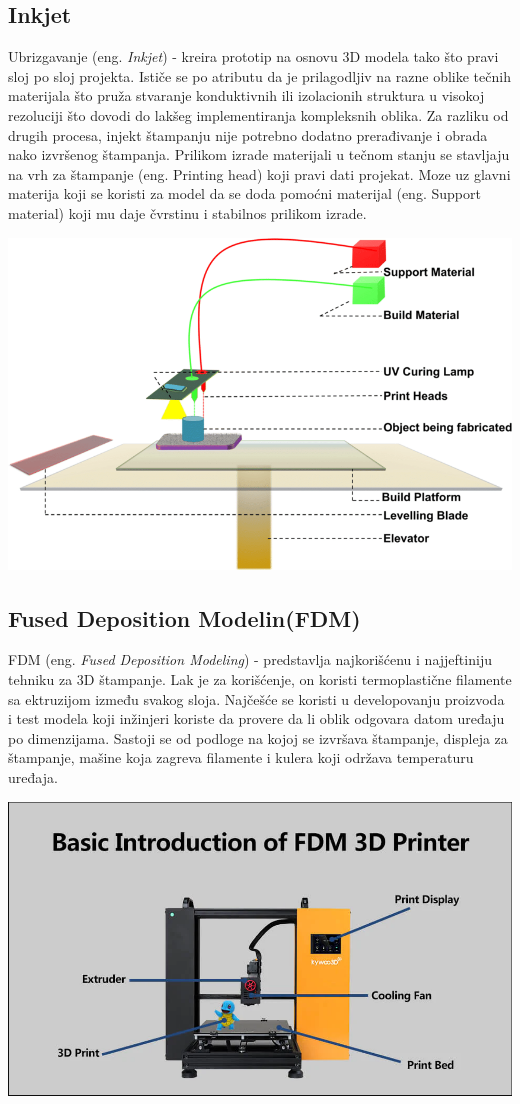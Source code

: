 \documentclass[a4paper]{article}
\begin{document}
\subsection{Inkjet}
\label{subsec:podnaslov1}
Ubrizgavanje (eng. \emph{Inkjet}) - kreira prototip na osnovu 3D modela tako što pravi sloj po sloj projekta.
\bigbreak Ističe se po atributu da je prilagodljiv na razne oblike tečnih materijala što pruža stvaranje konduktivnih ili izolacionih struktura u visokoj rezoluciji što dovodi do lakšeg implementiranja kompleksnih oblika. 
\bigbreak Za razliku od drugih procesa, injekt štampanju nije potrebno dodatno prerađivanje i obrada nako izvršenog štampanja.
\bigbreak Prilikom izrade materijali u tečnom stanju se stavljaju na vrh za štampanje (eng. Printing head) koji pravi dati projekat.
\bigbreak Moze uz glavni materija koji se koristi za model da se doda pomoćni materijal (eng. Support material) koji mu daje čvrstinu i stabilnos prilikom izrade.
\begin{center}
\includegraphics[width=.5\textwidth ]{Tehnikeslike/Inject.png}
\end{center}

\subsection{Fused Deposition Modelin(FDM)\cite{fdm}}
\label{subsec:podnaslov2}
FDM (eng. \emph{Fused Deposition Modeling}) - predstavlja najkorišćenu i najjeftiniju tehniku za 3D štampanje. Lak je za korišćenje, on koristi termoplastične filamente sa ektruzijom između svakog sloja.
\bigbreak Najčešće se koristi u developovanju proizvoda  i test modela koji inžinjeri koriste da provere da li oblik odgovara datom uređaju po dimenzijama. 
\bigbreak Sastoji se od podloge na kojoj se izvršava štampanje, displeja za štampanje, mašine koja zagreva filamente i kulera koji održava temperaturu uređaja.

\begin{center}
\includegraphics[width=.5\textwidth ]{Tehnikeslike/FDM.PNG}
\end{center}
\end{document}
